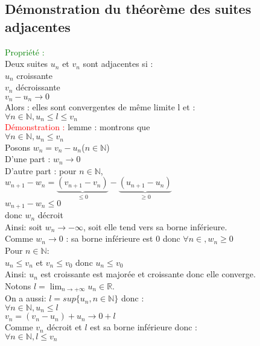 \documentclass{article}
\begin{document}
\subsection{Démonstration du théorème des suites adjacentes}
\textcolor{green}{Propriété :} \\ 
Deux suites $u_n$ et $v_n$ sont adjacentes si : \\ 
$u_n$ croissante \\ 
$v_n$ décroissante \\ 
$v_n-u_n \rightarrow 0$ \\ 
Alors : elles sont convergentes de même limite l et : \\ 
$\forall n \in \mathbb{N}, u_n \leq l \leq v_n$ \\ 
\textcolor{red}{Démonstration :} lemme : montrons que \\ 
$\forall n \in \mathbb{N}, u_n \leq v_n$ \\ 
Posons $w_n=v_n-u_n$($n\in \mathbb{N}$) \\ 
D'une part : $w_n \rightarrow 0$ \\ 
D'autre part : pour $n \in \mathbb{N}$, \\ 
$w_{n+1}-w_n=\underbrace{(v_{n+1}-v_n)}_{\leq 0}-\underbrace{(u_{n+1}-u_n)}_{\geq 0}$ \\ 
$w_{n+1}-w_n \leq 0$ \\ 
donc $w_n$ décroit  \\
Ainsi: soit $w_n \rightarrow - \infty$, soit elle tend vers sa borne inférieure. \\
Comme $w_n \rightarrow 0$ : sa borne inférieure est 0 donc $\forall n \in \mathbb, w_n \geq 0$ \\ 
Pour $n \in \mathbb{N}$: \\ 
$u_n \leq v_n$ et $v_n \leq v_0$ donc $u_n \leq v_0$ \\ 
Ainsi: $u_n$ est croissante est majorée et croissante donc elle converge. \\ 
Notons $l= \lim_{n\rightarrow + \infty} u_n \in \mathbb{R}$. \\ 
On a aussi: $l=sup \lbrace u_n, n \in \mathbb{N} \rbrace $ donc : \\ 
$\forall n \in \mathbb{N},u_n \leq l$ \\ 
$v_n=(v_n-u_n)+u_n \rightarrow 0+l$ \\ 
Comme $v_n$ décroit et $l$ est sa borne inférieure donc : \\ 
$\forall n \in \mathbb{N}, l\leq v_n$
\end{document}
